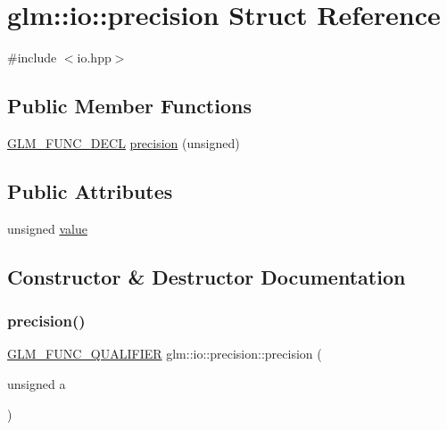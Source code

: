 \hypertarget{structglm_1_1io_1_1precision}{}\section{glm\+:\+:io\+:\+:precision Struct Reference}
\label{structglm_1_1io_1_1precision}


{\ttfamily \#include $<$io.\+hpp$>$}

\subsection*{Public Member Functions}
\begin{DoxyCompactItemize}
\item 
\mbox{\hyperlink{setup_8hpp_ab2d052de21a70539923e9bcbf6e83a51}{G\+L\+M\+\_\+\+F\+U\+N\+C\+\_\+\+D\+E\+CL}} \mbox{\hyperlink{structglm_1_1io_1_1precision_aa359e1766fd74b88e049d5449d521447}{precision}} (unsigned)
\end{DoxyCompactItemize}
\subsection*{Public Attributes}
\begin{DoxyCompactItemize}
\item 
unsigned \mbox{\hyperlink{structglm_1_1io_1_1precision_a43da772dff9a209768c63f1220d52074}{value}}
\end{DoxyCompactItemize}


\subsection{Constructor \& Destructor Documentation}
\mbox{\label{structglm_1_1io_1_1precision_aa359e1766fd74b88e049d5449d521447}} 
\subsubsection{\texorpdfstring{precision()}{precision()}}
{\footnotesize\ttfamily \mbox{\hyperlink{setup_8hpp_a33fdea6f91c5f834105f7415e2a64407}{G\+L\+M\+\_\+\+F\+U\+N\+C\+\_\+\+Q\+U\+A\+L\+I\+F\+I\+ER}} glm\+::io\+::precision\+::precision (\begin{DoxyParamCaption}\item[{unsigned}]{a }\end{DoxyParamCaption})\hspace{0.3cm}{\ttfamily [explicit]}}



